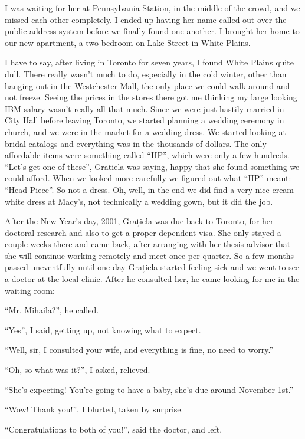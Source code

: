 \documentclass[12pt]{book}
\begin{document}
I was waiting for her at Pennsylvania Station, in the middle of the
crowd, and we missed each other completely. I ended up having her name
called out over the public address system before we finally found one
another. I brought her home to our new apartment, a two-bedroom on Lake
Street in White Plains.

I have to say, after living in Toronto for seven years, I found White
Plains quite dull. There really wasn't much to do, especially in the
cold winter, other than hanging out in the Westchester Mall, the only
place we could walk around and not freeze. Seeing the prices in the
stores there got me thinking my large looking IBM salary wasn't really
all that much. Since we were just hastily married in City Hall before
leaving Toronto, we started planning a wedding ceremony in church, and
we were in the market for a wedding dress. We started looking at bridal
catalogs and everything was in the thousands of dollars. The only
affordable items were something called ``HP'', which were only a few
hundreds. ``Let's get one of these'', Grațiela was saying, happy that
she found something we could afford. When we looked more carefully we
figured out what ``HP'' meant: ``Head Piece''. So not a dress. Oh, well,
in the end we did find a very nice cream-white dress at Macy's, not
technically a wedding gown, but it did the job.

After the New Year's day, 2001, Grațiela was due back to Toronto, for
her doctoral research and also to get a proper dependent visa. She only
stayed a couple weeks there and came back, after arranging with her
thesis advisor that she will continue working remotely and meet once per
quarter. So a few months passed uneventfully until one day Grațiela
started feeling sick and we went to see a doctor at the local clinic.
After he consulted her, he came looking for me in the waiting room:

``Mr. Mihaila?'', he called.

``Yes'', I said, getting up, not knowing what to expect.

``Well, sir, I consulted your wife, and everything is fine, no need to
worry.''

``Oh, so what was it?'', I asked, relieved.

``She's expecting! You're going to have a baby, she's due around
November 1st.''

``Wow! Thank you!'', I blurted, taken by surprise.

``Congratulations to both of you!'', said the doctor, and left.
\end{document}
